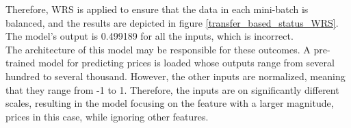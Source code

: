 \documentclass[12pt,twoside]{report}
\begin{document}
Therefore, WRS is applied to ensure that the data in each mini-batch is balanced, and the results are depicted in figure \ref{transfer_based_status_WRS}. The model's output is 0.499189 for all the inputs, which is incorrect. 
\\

The architecture of this model may be responsible for these outcomes. A pre-trained model for predicting prices is loaded whose outputs range from several hundred to several thousand. However, the other inputs are normalized, meaning that they range from -1 to 1. Therefore, the inputs are on significantly different scales, resulting in the model focusing on the feature with a larger magnitude, prices in this case, while ignoring other features. 
\\

\begin{figure}[!htbp]
	\centering
	\hfill
	\hfill
	\hfil

\end{figure}
\end{document}
